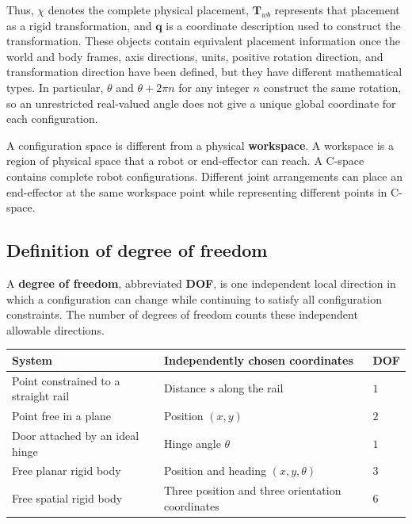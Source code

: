\documentclass[
  australian,
  12pt,
  letterpaper,
  DIV=11,
  numbers=noendperiod,
  twoside]{scrreprt}
\newcounter{none} %
\begin{document}
Thus, \(\chi\) denotes the complete physical placement,
\(\mathbf T_{wb}\) represents that placement as a rigid transformation,
and \(\mathbf q\) is a coordinate description used to construct the
transformation. These objects contain equivalent placement information
once the world and body frames, axis directions, units, positive
rotation direction, and transformation direction have been defined, but
they have different mathematical types. In particular, \(\theta\) and
\(\theta+2\pi n\) for any integer \(n\) construct the same rotation, so
an unrestricted real-valued angle does not give a unique global
coordinate for each configuration.

A configuration space is different from a physical \textbf{workspace}. A
workspace is a region of physical space that a robot or end-effector can
reach. A C-space contains complete robot configurations. Different joint
arrangements can place an end-effector at the same workspace point while
representing different points in C-space.

\subsection{Definition of degree of
freedom}\label{definition-of-degree-of-freedom}

A \textbf{degree of freedom}, abbreviated \textbf{DOF}, is one
independent local direction in which a configuration can change while
continuing to satisfy all configuration constraints. The number of
degrees of freedom counts these independent allowable directions.

{\def\LTcaptype{none} %
\begin{longtable}[]{@{}
  >{\raggedright\arraybackslash}p{}
  >{\raggedright\arraybackslash}p{}
  >{\raggedleft\arraybackslash}p{}@{}}
\toprule\noalign{}
\begin{minipage}[b]{\linewidth}\raggedright
System
\end{minipage} & \begin{minipage}[b]{\linewidth}\raggedright
Independently chosen coordinates
\end{minipage} & \begin{minipage}[b]{\linewidth}\raggedleft
DOF
\end{minipage} \\
\midrule\noalign{}
\endhead
\bottomrule\noalign{}
\endlastfoot
Point constrained to a straight rail & Distance \(s\) along the rail &
\(1\) \\
Point free in a plane & Position \((x,y)\) & \(2\) \\
Door attached by an ideal hinge & Hinge angle \(\theta\) & \(1\) \\
Free planar rigid body & Position and heading \((x,y,\theta)\) &
\(3\) \\
Free spatial rigid body & Three position and three orientation
coordinates & \(6\) \\
\end{longtable}
}
\end{document}
